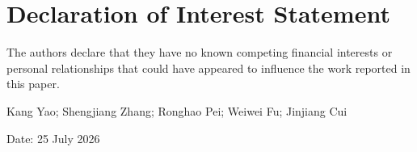 \documentclass[11pt]{article}
\begin{document}
\section*{Declaration of Interest Statement}

The authors declare that they have no known competing financial
interests or personal relationships that could have appeared to
influence the work reported in this paper.

\vspace{12mm}
Kang Yao; Shengjiang Zhang; Ronghao Pei; Weiwei Fu; Jinjiang Cui

\vspace{8mm}
Date: 25 July 2026
\end{document}
